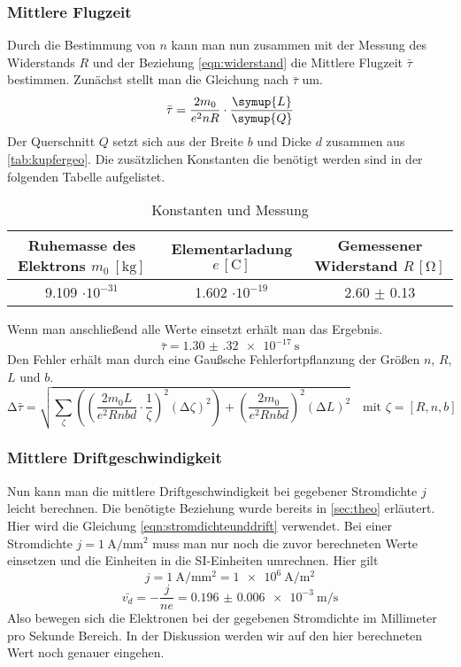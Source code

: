 \subsubsection{Mittlere Flugzeit}
Durch die Bestimmung von $n$ kann man nun zusammen mit der Messung des Widerstands $R$ und der Beziehung \eqref{eqn:widerstand} die Mittlere Flugzeit $\bar{\tau}$ bestimmen. 
Zunächst stellt man die Gleichung nach $\bar{\tau}$ um.
\begin{equation}
\bar{\tau} = \frac{2m_{0}}{e^{2}n R} \cdot \frac{\symup{L}}{\symup{Q}}
\end{equation}
Der Querschnitt $Q$ setzt sich aus der Breite $b$ und Dicke $d$ zusammen aus \ref{tab:kupfergeo}.
Die zusätzlichen Konstanten die benötigt werden sind in der folgenden Tabelle aufgelistet.
\begin{table}
  \centering
  \caption{Konstanten und Messung}
  \label{tab:konstantenrechnung}
  \begin{tabular}{c c c}
    Ruhemasse des Elektrons {$m_{0} \: [\si{\kilo\gram}]$} & Elementarladung {$e \, [\si{\coulomb}]$} & Gemessener Widerstand {$R \, [\si{\ohm}]$}\\
    \midrule
    9.109 $\cdot 10^{-31}$   & 1.602 $\cdot 10^{-19}$ & 2.60 $\pm$ 0.13\\
    \bottomrule
  \end{tabular}
\end{table}
Wenn man anschließend alle Werte einsetzt erhält man das Ergebnis.
\begin{equation}
\bar{\tau} = \SI{1.30(32)e-17}{\second}
\end{equation}
Den Fehler erhält man durch eine Gaußsche Fehlerfortpflanzung der Größen $n$, $R$, $L$ und $b$.
\begin{equation}
\increment \bar{\tau} = \sqrt{\sum_{\zeta}\left( \left( \frac{2m_{0}L}{e^{2}Rnbd} \cdot \frac{1}{\zeta}\right)^{2} (\increment \zeta)^2 \right) + \left( \frac{2m_{0}}{e^{2}Rnbd} \right)^{2} (\increment L)^{2}} \quad \text{mit } \zeta =[R, n, b]
\end{equation}

\subsubsection{Mittlere Driftgeschwindigkeit}
Nun kann man die mittlere Driftgeschwindigkeit bei gegebener Stromdichte $j$ leicht berechnen. Die benötigte Beziehung wurde bereits in \ref{sec:theo} erläutert.
Hier wird die Gleichung \eqref{eqn:stromdichteunddrift} verwendet. Bei einer Stromdichte $j = \SI{1}{\ampere\per\milli\meter\squared}$ muss man nur noch die zuvor berechneten Werte einsetzen und
die Einheiten in die SI-Einheiten umrechnen. Hier gilt
\begin{equation}
j = \SI{1}{\ampere\per\milli\meter\squared} = \SI{1e6}{\ampere\per\meter\squared}
\end{equation}
\begin{equation}
\bar{v_{d}} = - \frac{j}{n e} = \SI{0.196(6)e-3}{\meter\per\second}
\end{equation}
Also bewegen sich die Elektronen bei der gegebenen Stromdichte im Millimeter pro Sekunde Bereich. In der Diskussion werden wir auf den 
hier berechneten Wert noch genauer eingehen.

